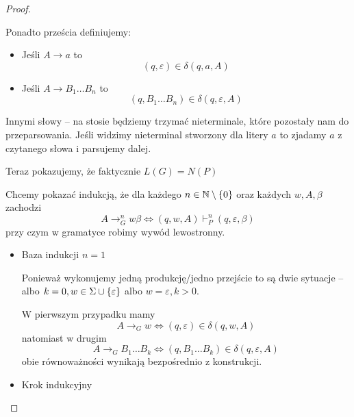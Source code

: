 \begin{proof}
\begin{description}
        Ponadto prześcia definiujemy:
        \begin{itemize}
            \item Jeśli \( A \rightarrow a \) to 
            \[
                (q, \varepsilon) \in \delta(q, a, A)
            \]
            
            \item Jeśli \( A \rightarrow B_1\dots B_n \) to
            \[
                (q, B_1\dots B_n) \in \delta(q, \varepsilon, A)
            \]
        \end{itemize}
        
        Innymi słowy -- na stosie będziemy trzymać nieterminale, które pozostały nam do przeparsowania.
        Jeśli widzimy nieterminal stworzony dla litery \( a \) to zjadamy \( a \) z czytanego słowa i parsujemy dalej.
        
        Teraz pokazujemy, że faktycznie \( L(G) = N(P) \)
        
        Chcemy pokazać indukcją, że dla każdego \( n \in \natural \setminus \set{0} \) oraz każdych \( w, A, \beta \) zachodzi
        \[
            A \rightarrow_G^n w\beta \iff (q, w, A) \vdash_P^n (q, \varepsilon, \beta)
        \]
        przy czym w gramatyce robimy wywód lewostronny.
        
        \begin{itemize}
            \item Baza indukcji \( n = 1 \)
                
                Ponieważ wykonujemy jedną produkcję/jedno przejście to są dwie sytuacje -- albo \( k = 0, w \in \Sigma \cup \set{\varepsilon} \) albo \( w = \varepsilon, k > 0 \).
                
                W pierwszym przypadku mamy
                \[
                    A \rightarrow_G w \iff (q, \varepsilon) \in \delta(q, w, A)
                \]
                natomiast w drugim
                \[
                    A \rightarrow_G B_1 \dots B_k \iff (q, B_1\dots B_k) \in \delta(q, \varepsilon, A)
                \]
                obie równoważności wynikają bezpośrednio z konstrukcji.
                
            \item Krok indukcyjny
            
            
            
        \end{itemize}
        
        
    \end{description}
\end{proof}